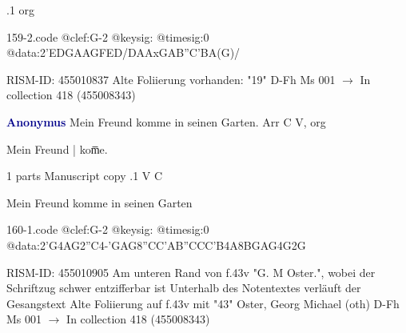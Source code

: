 \documentclass[twocolumn]{book}
\begin{document}
.1  org  
\begin{filecontents*}{159-2.code}
@clef:G-2
@keysig:
@timesig:0
@data:2'EDGAAGFED/DAAxGAB''C'BA(G)/
\end{filecontents*}
\newline
%

\newline RISM-ID: 455010837
\newline Alte Foliierung vorhanden: "19"
\newline D-Fh  Ms 001
\newline $\rightarrow$ In collection 418 (455008343)

\newline \par \vspace{7pt} \textcolor{darkblue}{\textbf{Anonymus  }}
\newline Mein Freund komme in seinen Garten. Arr  C  
\newline V, org
\newline \begin{itshape}[f.43v, at left:] Mein Freund | kom̅e.\end{itshape} 
\newline \textcolor{darkblue}{}  1 parts  
\newline Manuscript copy
.1  V  C
\newline \begin{footnotesize} Mein Freund komme in seinen Garten \end{footnotesize}  
\begin{filecontents*}{160-1.code}
@clef:G-2
@keysig:
@timesig:0
@data:2'G4AG2''C4-'GAG{8''CC'AB}{''CCC'B}4A{8BG}{AG}4G2G
\end{filecontents*}
\newline
%

\newline RISM-ID: 455010905
\newline Am unteren Rand von f.43v "G. M Oster.", wobei der Schriftzug schwer entzifferbar ist
\newline Unterhalb des Notentextes verläuft der Gesangstext
\newline Alte Foliierung auf f.43v mit "43"
\newline Oster, Georg Michael  (oth)
\newline D-Fh  Ms 001
\newline $\rightarrow$ In collection 418 (455008343)
\end{document}
